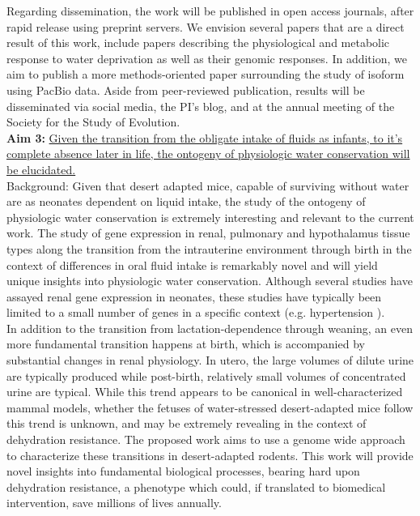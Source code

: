 \documentclass[11pt]{article}
\begin{document}
Regarding dissemination, the work will be published in open access journals, after rapid release using preprint servers. We envision several papers that are a direct result of this work, include papers describing the physiological and metabolic response to water deprivation as well as their genomic responses. In addition, we aim to publish a more methods-oriented paper surrounding the study of isoform using PacBio data. Aside from peer-reviewed publication, results will be disseminated via social media, the PI's blog, and at the annual meeting of the Society for the Study of Evolution. \\       




\noindent \textbf{Aim 3:} \ul{Given the transition from the obligate intake of fluids as infants, to it’s complete absence later in life, the ontogeny of physiologic water conservation will be elucidated.} \\

Background: Given that desert adapted mice, capable of surviving without water are as neonates dependent on liquid intake, {the study of the ontogeny of physiologic water conservation is extremely interesting and relevant to the current work.} The study of gene expression in renal, pulmonary and hypothalamus tissue types along the transition from the intrauterine environment through birth in the context of differences in oral fluid intake is remarkably novel and will yield unique insights into physiologic water conservation. Although several studies have assayed renal gene expression in neonates, these studies have typically been limited to a small number of genes in a specific context (e.g. hypertension \citep{Sampson:2012hb,Shanmugam:1996ed}). \\

In addition to the transition from lactation-dependence through weaning, an even more fundamental transition happens at birth, which is accompanied by substantial changes in renal physiology. In utero, the large volumes of dilute urine are typically produced \citep{Wintour:1997ts} while post-birth, relatively small volumes of concentrated urine are typical. While this trend appears to be canonical in well-characterized mammal models, whether the fetuses of water-stressed desert-adapted mice follow this trend is unknown, and may be extremely revealing in the context of dehydration resistance. The proposed work aims to use a genome wide approach to characterize these transitions in desert-adapted rodents. This work will provide novel insights into fundamental biological processes, bearing hard upon dehydration resistance, a phenotype which could, if translated to biomedical intervention, save millions of lives annually.  \\  
\end{document}
